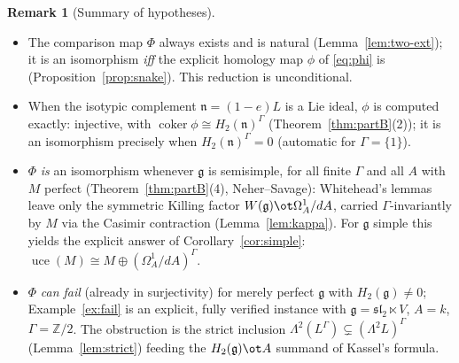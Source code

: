 \documentclass{amsart}
\theoremstyle{definition}
\newtheorem{remark}{Remark}
\DeclareMathOperator{\uce}{uce}
\newcommand{\g}{\mathfrak{g}}
\newcommand{\nn}{\mathfrak{n}}
\newcommand{\sw}{\mathfrak{sl}}
\newcommand{\Om}{\Omega}
\newcommand{\Gm}{\Gamma}
\begin{document}
\begin{remark}[Summary of hypotheses]\label{rem:summary}
\begin{itemize}
\item The comparison map $\Phi$ always exists and is natural
(Lemma~\ref{lem:two-ext}); it is an isomorphism \emph{iff} the explicit homology
map $\phi$ of \eqref{eq:phi} is (Proposition~\ref{prop:snake}).  This reduction is
unconditional.
\item When the isotypic complement $\nn=(1-e)L$ is a Lie ideal, $\phi$ is computed
exactly: injective, with $\operatorname{coker}\phi\cong H_2(\nn)^{\Gm}$
(Theorem~\ref{thm:partB}(2)); it is an isomorphism precisely when $H_2(\nn)^{\Gm}=0$
(automatic for $\Gm=\{1\}$).
\item $\Phi$ \emph{is} an isomorphism whenever $\g$ is semisimple, for all finite
$\Gm$ and all $A$ with $M$ perfect (Theorem~\ref{thm:partB}(4),
Neher--Savage): Whitehead's lemmas leave only the symmetric Killing factor
$W(\g)\ot\Om^1_A/dA$, carried $\Gm$-invariantly by $M$ via the Casimir contraction
(Lemma~\ref{lem:kappa}).  For $\g$ simple this yields the explicit answer of
Corollary~\ref{cor:simple}: $\uce(M)\cong M\oplus(\Om^1_A/dA)^{\Gm}$.
\item $\Phi$ \emph{can fail} (already in surjectivity) for merely perfect $\g$ with
$H_2(\g)\ne0$; Example~\ref{ex:fail} is an explicit, fully verified instance with
$\g=\sw_2\ltimes V$, $A=k$, $\Gm=\mathbb Z/2$.  The obstruction is the strict
inclusion $\Lambda^2(L^{\Gm})\subsetneq(\Lambda^2 L)^{\Gm}$ (Lemma~\ref{lem:strict})
feeding the $H_2(\g)\ot A$ summand of Kassel's formula.
\end{itemize}
\end{remark}
\end{document}
